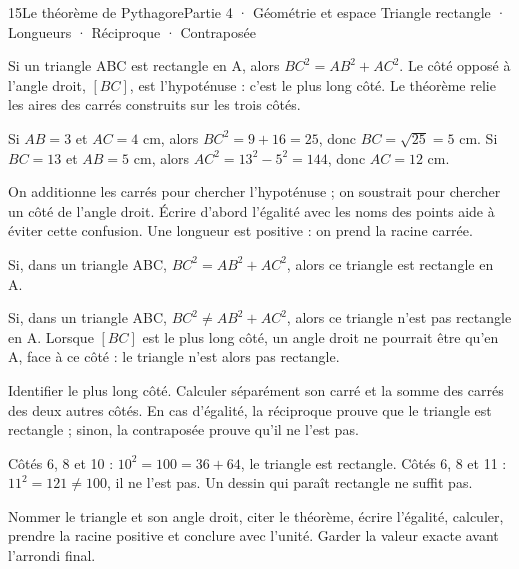 \begin{ouverture}[geometrie]{15}{Le théorème de Pythagore}{Partie 4 · Géométrie et espace}
{Triangle rectangle · Longueurs · Réciproque · Contraposée}
\end{ouverture}
\pagestyle{otMain}\essentiel\fontsize{11}{15}\selectfont
{}\label{cours-15-1}
\begin{theoreme}Si un triangle ABC est rectangle en A, alors $BC^2=AB^2+AC^2$. Le côté opposé à l’angle droit, $[BC]$, est l’hypoténuse : c’est le plus long côté. Le théorème relie les aires des carrés construits sur les trois côtés.\end{theoreme}
\label{fig-cours-15-1-cours-pythagore}

\begin{exemple}Si $AB=3$ et $AC=4$ cm, alors $BC^2=9+16=25$, donc $BC=\sqrt{25}=5$ cm. Si $BC=13$ et $AB=5$ cm, alors $AC^2=13^2-5^2=144$, donc $AC=12$ cm.\end{exemple}
\begin{attention}On additionne les carrés pour chercher l’hypoténuse ; on soustrait pour chercher un côté de l’angle droit. Écrire d’abord l’égalité avec les noms des points aide à éviter cette confusion. Une longueur est positive : on prend la racine carrée.\end{attention}
\clearpage
{}\label{cours-15-2}
\begin{theoreme}Si, dans un triangle ABC, $BC^2=AB^2+AC^2$, alors ce triangle est rectangle en A.\end{theoreme}
\begin{propriete}[Contraposée]Si, dans un triangle ABC, $BC^2\ne AB^2+AC^2$, alors ce triangle n’est pas rectangle en A. Lorsque $[BC]$ est le plus long côté, un angle droit ne pourrait être qu’en A, face à ce côté : le triangle n’est alors pas rectangle.\end{propriete}
\begin{savoirfaire}Identifier le plus long côté. Calculer séparément son carré et la somme des carrés des deux autres côtés. En cas d’égalité, la réciproque prouve que le triangle est rectangle ; sinon, la contraposée prouve qu’il ne l’est pas.\end{savoirfaire}
\begin{exemple}Côtés 6, 8 et 10 : $10^2=100=36+64$, le triangle est rectangle. Côtés 6, 8 et 11 : $11^2=121\ne100$, il ne l’est pas. Un dessin qui paraît rectangle ne suffit pas.\end{exemple}
\begin{savoirfaire}[Rédiger]Nommer le triangle et son angle droit, citer le théorème, écrire l’égalité, calculer, prendre la racine positive et conclure avec l’unité. Garder la valeur exacte avant l’arrondi final.\end{savoirfaire}

